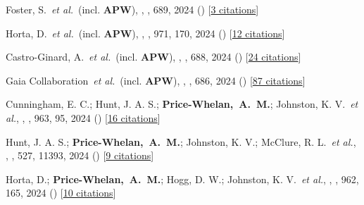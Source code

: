 \item[{\color{deemph}\scriptsize129}]Foster, S.~\textit{et al.}~(incl. \textbf{APW}), , \aanda, 689, 2024 () [\href{http://adsabs.harvard.edu/abs/2024A&A...689A.230F}{3 citations}]

\item[{\color{deemph}\scriptsize128}]Horta, D.~\textit{et al.}~(incl. \textbf{APW}), , \apj, 971, 170, 2024 () [\href{http://adsabs.harvard.edu/abs/2024ApJ...971..170H}{12 citations}]

\item[{\color{deemph}\scriptsize127}]Castro-Ginard, A.~\textit{et al.}~(incl. \textbf{APW}), , \aanda, 688, 2024 () [\href{http://adsabs.harvard.edu/abs/2024A&A...688A...1C}{24 citations}]

\item[{\color{deemph}\scriptsize126}]Gaia Collaboration~\textit{et al.}~(incl. \textbf{APW}), , \aanda, 686, 2024 () [\href{http://adsabs.harvard.edu/abs/2024A&A...686L...2G}{87 citations}]

\item[{\color{deemph}\scriptsize125}]Cunningham, E. C.; Hunt, J. A. S.; \textbf{Price-Whelan,~A.~M.}; Johnston, K. V.~\textit{et al.}, , \apj, 963, 95, 2024 () [\href{http://adsabs.harvard.edu/abs/2024ApJ...963...95C}{16 citations}]

\item[{\color{deemph}\scriptsize124}]Hunt, J. A. S.; \textbf{Price-Whelan,~A.~M.}; Johnston, K. V.; McClure, R. L.~\textit{et al.}, , \mnras, 527, 11393, 2024 () [\href{http://adsabs.harvard.edu/abs/2024MNRAS.52711393H}{9 citations}]

\item[{\color{deemph}\scriptsize123}]Horta, D.; \textbf{Price-Whelan,~A.~M.}; Hogg, D. W.; Johnston, K. V.~\textit{et al.}, , \apj, 962, 165, 2024 () [\href{http://adsabs.harvard.edu/abs/2024ApJ...962..165H}{10 citations}]

